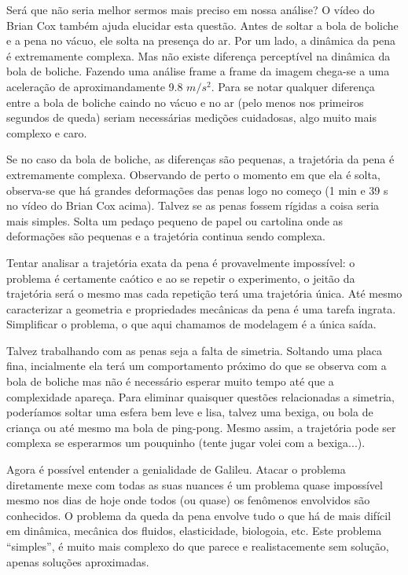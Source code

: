 Será que não seria melhor sermos mais preciso em nossa análise? O vídeo do Brian Cox também ajuda elucidar esta questão. Antes de soltar a bola de boliche e a pena no vácuo, ele solta na presença do ar. Por um lado, a dinâmica da pena é extremamente complexa. Mas não existe diferença perceptível na dinâmica da bola de boliche. Fazendo uma análise frame a frame da imagem chega-se a uma aceleração de aproximandamente 9.8 $m/s^2$. Para se notar qualquer diferença entre a bola de boliche caindo no vácuo e no ar (pelo menos nos primeiros segundos de queda) seriam necessárias medições cuidadosas, algo muito mais complexo e caro.

Se no caso da bola de boliche, as diferenças são pequenas, a trajetória da pena é extremamente complexa. Observando de perto o momento em que ela é solta, observa-se que há grandes deformações das penas logo no começo (1 min e 39 s no vídeo do Brian Cox acima). Talvez se as penas fossem rígidas a coisa seria mais simples. Solta um pedaço pequeno de papel ou cartolina onde as deformações são pequenas e a trajetória continua sendo complexa.

Tentar analisar a trajetória exata da pena é provavelmente impossível: o problema é certamente caótico e ao se repetir o experimento, o jeitão da trajetória será o mesmo mas cada repetição terá uma trajetória única. Até mesmo caracterizar a geometria e propriedades mecânicas da pena é uma tarefa ingrata. Simplificar o problema, o que aqui chamamos de modelagem é a única saída.

Talvez trabalhando com as penas seja a falta de simetria. Soltando uma placa fina, incialmente ela terá um comportamento próximo do que se observa com a bola de boliche mas não é necessário esperar muito tempo até que a complexidade apareça. Para eliminar quaisquer questões relacionadas a simetria, poderíamos soltar uma esfera bem leve e lisa, talvez uma bexiga, ou bola de criança ou até mesmo ma bola de ping-pong. Mesmo assim, a trajetória pode ser complexa se esperarmos um pouquinho (tente jugar volei com a bexiga...).


Agora é possível entender a genialidade de Galileu. Atacar o problema diretamente mexe com todas as suas nuances  é um problema quase impossível mesmo nos dias de hoje onde todos (ou quase) os fenômenos envolvidos são conhecidos. O problema da queda da pena envolve tudo o que há de mais difícil  em dinâmica, mecânica dos fluidos, elasticidade, biologoia, etc. Este problema ``simples'', é muito mais complexo do que parece e realistacemente sem solução, apenas soluções aproximadas.


